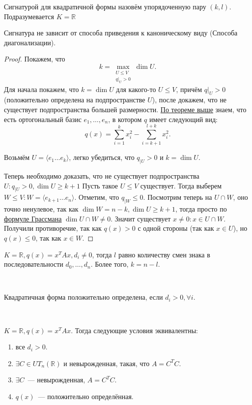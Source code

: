 \begin{definition}
    Сигнатурой для квадратичной формы назовём упорядоченную пару $(k,l)$. Подразумевается $K = \mathbb{R}$
\end{definition}
\begin{theorem}
    Сигнатура не зависит от способа приведения к каноническому виду (Способа диагонализации).
\end{theorem}
\begin{proof}
    Покажем, что 
    \[
        k = \max_{\substack{U\le V \\ q|_U > 0}} \dim U
    .\] 
    Для начала покажем, что $k = \dim U$ для какого-то  $U\le V$, причём $q|_U > 0$
    (положительно определена на подпространстве $U$), после докажем, что не существует
    подпространства большей размерности.
    \hyperref[stm:О приведении квадратичной формы к каноническому виду]{По теореме выше}
    знаем, что есть ортогональный базис $e_1,\dots,e_n$, в котором $q$ имеет следующий вид:
     \[
         q(x) = \sum\limits_{i=1}^{k}{x_i^2} - \sum\limits_{i = k + 1}^{l + k}{x^2_i}
    .\] 

    Возьмём $U = \langle e_1\dots e_k\rangle$, легко убедиться, что $q_{|U} > 0$ и $k = \dim U$.

    Теперь необходимо доказать, что не существует подпространства $U\colon
    q_{|U} > 0, \dim U \ge k + 1$
    Пусть такое $U \le V$ существует. Тогда выберем $W \le V \colon W = \langle e_{k + 1} \dots e_n\rangle$.
    Отметим, что $q_{|W} \le 0$. Посмотрим теперь на  $U \cap W$, оно точно ненулевое,
    так как $\dim W = n - k, \dim U \ge k + 1$, тогда просто по 
    \hyperref[thm:Формула Грассмана]{формуле Грассмана} $\dim U \cap W \not= 0$.
    Значит существует  $x \not= 0\colon x\in U\cap W$. Получили противоречие, так как $q(x) > 0$ с одной стороны
    (так как $x\in U$), но $q(x) \le 0$, так как $x\in W$.
\end{proof}
\begin{follow}
    $K = \mathbb{R}, q(x) = x^T A x, d_i \not= 0$, тогда $l$ равно количеству смен знака в
    последовательности $d_0,\dots,d_n$. Более того, $k = n - l$.
\end{follow}
\\\quad
\begin{follow}
    Квадратичная форма положительно определена, если $d_i > 0, \forall i$.
\end{follow}
\\\quad
\begin{theorem}
     $K = \mathbb{R}, q(x) = x^TAx.$ 
     Тогда следующие условия эквивалентны:
     \begin{enumerate}
         \item все $d_i > 0$.
         \item $\exists C \in UT_n(\mathbb{R})$ и невырожденная, такая, что $A = C^T C$.
         \item  $\exists C$~--- невырожденная, $A = C^T C$.
         \item  $q(x)$~--- положительно определённая.
     \end{enumerate}
\end{theorem}
